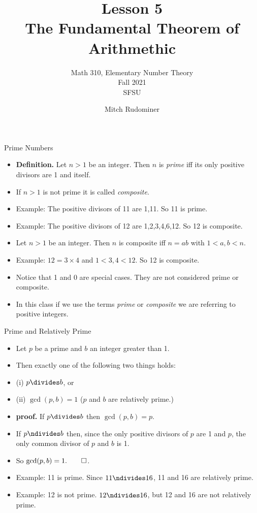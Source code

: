 \documentclass[handout]{beamer}
\title{Lesson 5 \\ The Fundamental Theorem of Arithmethic}
\subtitle{Math 310, Elementary Number Theory \\ Fall 2021 \\ SFSU}
\author{Mitch Rudominer}
\date{}
\begin{document}
\begin{frame}
  \titlepage
\end{frame}


\begin{frame}{Prime Numbers}

\begin{itemize}
  \item \textbf{Definition.} Let $n>1$ be an integer. Then $n$ is \emph{prime} iff its only positive divisors are 1 and itself.
  \item If $n>1$ is not prime it is called \emph{composite}.
  \item Example: The positive divisors of 11 are 1,11. So 11 is prime.
  \item Example: The positive divisors of 12 are 1,2,3,4,6,12. So 12 is composite.
  \item Let $n>1$ be an integer. Then $n$ is composite iff $n=ab$ with $1<a,b<n$.
  \item Example: $12 = 3 \times 4$ and $1<3,4<12$. So 12 is composite.
  \item Notice that 1 and 0 are special cases. They are not considered prime or composite.
  \item In this class if we use the terms \emph{prime} or \emph{composite} we are
  referring to positive integers.
\end{itemize}

\end{frame}


\begin{frame}{Prime and Relatively Prime}

\begin{itemize}
  \item Let $p$ be a prime and $b$ an integer greater than 1.
  \item Then exactly one of the following two things holds:
  \item (i) $p \divides b$, or
  \item (ii) $\gcd(p,b) = 1$ ($p$ and $b$ are relatively prime.)
  \item \textbf{proof.} If $p\divides b$ then $\gcd(p,b) = p$.
  \item If $p\ndivides b$
  then, since the only positive divisors of $p$ are 1 and $p$, the only common
  divisor of $p$ and $b$ is 1.
  \item So $\gcd(p,b) = 1. \qed$.
  \item Example: 11 is prime. Since $11\ndivides 16$, 11 and 16 are relatively prime.
  \item Example: 12 is not prime. $12\ndivides 16$, but 12 and 16 are not relatively prime.
\end{itemize}

\end{frame}
\end{document}
